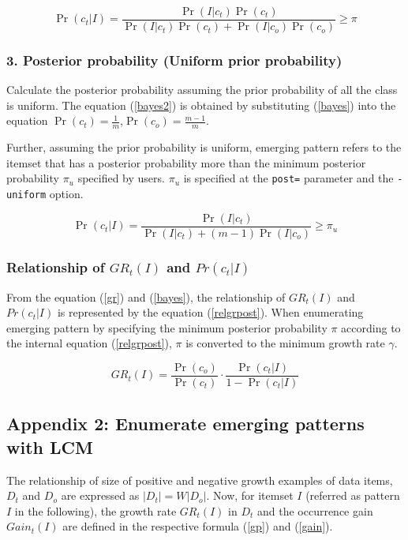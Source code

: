 \begin{equation}
\Pr(c_t|I)=\frac{\Pr(I|c_t)\Pr(c_t)}{\Pr(I|c_t)\Pr(c_t)+\Pr(I|c_o)\Pr(c_o)} \ge \pi \label{bayes}
\end{equation}

\subsubsection*{3. Posterior probability (Uniform prior probability)}
Calculate the posterior probability assuming the prior probability of all the class is uniform.
The equation (\ref{bayes2}) is obtained by substituting (\ref{bayes}) into the equation $\Pr(c_t)=\frac{1}{m}$,$\Pr(c_o)=\frac{m-1}{m}$.

Further, assuming the prior probability is uniform, emerging pattern refers to the itemset that has a posterior probability more than the minimum posterior probability $\pi_u$ specified by users.  
$\pi_u$ is specified at the \verb|post=| parameter and the \verb|-uniform| option. 

\begin{equation}
\Pr(c_t|I)=\frac{\Pr(I|c_t)}{\Pr(I|c_t)+(m-1)\Pr(I|c_o)} \ge \pi_{u} \label{bayes2}
\end{equation}

\subsubsection*{Relationship of $GR_t(I)$ and $Pr(c_t|I)$}
From the equation (\ref{gr}) and (\ref{bayes}), the relationship of $GR_t(I)$ and $Pr(c_t|I)$ is represented by the equation (\ref{relgrpost}).
When enumerating emerging pattern by specifying the minimum posterior probability $\pi$ according to the internal equation (\ref{relgrpost}), $\pi$  is converted to the minimum growth rate $\gamma$.

\begin{equation}
GR_t(I)=\frac{\Pr(c_o)}{\Pr(c_t)}\cdot \frac{\Pr(c_t|I)}{1-\Pr(c_t|I)} \label{relgrpost}
\end{equation}

\subsection*{Appendix 2: Enumerate emerging patterns with LCM}
The relationship of size of positive and negative growth examples of data items, $D_t$ and $D_o$ are expressed as $|D_t|=W |D_o|$.
Now, for itemset $I$ (referred as pattern $I$ in the following), the growth rate $GR_t(I)$ in $D_t$ and the occurrence gain $Gain_t(I)$ are defined in the respective formula (\ref{gp}) and (\ref{gain}).

